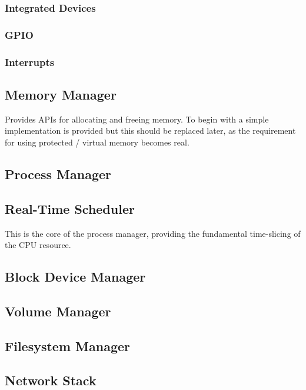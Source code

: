\subsubsection{Integrated Devices}
\subsubsection{GPIO}
\subsubsection{Interrupts}

\subsection{Memory Manager}
Provides APIs for allocating and freeing memory. To begin with a simple implementation is provided
but this should be replaced later, as the requirement for using protected / virtual memory becomes real.

\subsection{Process Manager}

\subsection{Real-Time Scheduler}
This is the core of the process manager, providing the fundamental time-slicing of the CPU resource.


\subsection{Block Device Manager}

\subsection{Volume Manager}

\subsection{Filesystem Manager}

\subsection{Network Stack}


